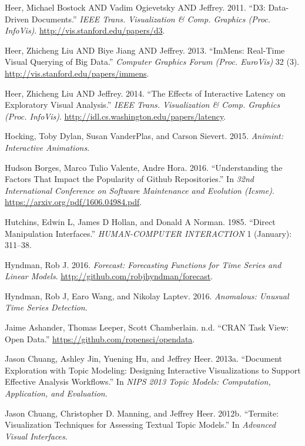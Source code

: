 \documentclass[12pt,]{isuthesis}
\begin{document}
\hypertarget{ref-Bostock:2011}{}
Heer, Michael Bostock AND Vadim Ogievetsky AND Jeffrey. 2011. ``D3:
Data-Driven Documents.'' \emph{IEEE Trans. Visualization \& Comp.
Graphics (Proc. InfoVis)}. \url{http://vis.stanford.edu/papers/d3}.

\hypertarget{ref-2013-immens}{}
Heer, Zhicheng Liu AND Biye Jiang AND Jeffrey. 2013. ``ImMens: Real-Time
Visual Querying of Big Data.'' \emph{Computer Graphics Forum (Proc.
EuroVis)} 32 (3). \url{http://vis.stanford.edu/papers/immens}.

\hypertarget{ref-2014-latency}{}
Heer, Zhicheng Liu AND Jeffrey. 2014. ``The Effects of Interactive
Latency on Exploratory Visual Analysis.'' \emph{IEEE Trans.
Visualization \& Comp. Graphics (Proc. InfoVis)}.
\url{http://idl.cs.washington.edu/papers/latency}.

\hypertarget{ref-animint}{}
Hocking, Toby Dylan, Susan VanderPlas, and Carson Sievert. 2015.
\emph{Animint: Interactive Animations}.

\hypertarget{ref-stars}{}
Hudson Borges, Marco Tulio Valente, Andre Hora. 2016. ``Understanding
the Factors That Impact the Popularity of Github Repositories.'' In
\emph{32nd International Conference on Software Maintenance and
Evolution (Icsme)}. \url{https://arxiv.org/pdf/1606.04984.pdf}.

\hypertarget{ref-Hutchins:1985wu}{}
Hutchins, Edwin L, James D Hollan, and Donald A Norman. 1985. ``Direct
Manipulation Interfaces.'' \emph{HUMAN-COMPUTER INTERACTION} 1
(January): 311--38.

\hypertarget{ref-forecast}{}
Hyndman, Rob J. 2016. \emph{Forecast: Forecasting Functions for Time
Series and Linear Models}. \url{http://github.com/robjhyndman/forecast}.

\hypertarget{ref-anomalous}{}
Hyndman, Rob J, Earo Wang, and Nikolay Laptev. 2016. \emph{Anomalous:
Unusual Time Series Detection}.

\hypertarget{ref-OpenData}{}
Jaime Ashander, Thomas Leeper, Scott Chamberlain. n.d. ``CRAN Task View:
Open Data.'' \url{https://github.com/ropensci/opendata}.

\hypertarget{ref-2013-termite}{}
Jason Chuang, Ashley Jin, Yuening Hu, and Jeffrey Heer. 2013a.
``Document Exploration with Topic Modeling: Designing Interactive
Visualizations to Support Effective Analysis Workflows.'' In \emph{NIPS
2013 Topic Models: Computation, Application, and Evaluation}.

\hypertarget{ref-2012-termite}{}
Jason Chuang, Christopher D. Manning, and Jeffrey Heer. 2012b.
``Termite: Visualization Techniques for Assessing Textual Topic
Models.'' In \emph{Advanced Visual Interfaces}.
\end{document}
